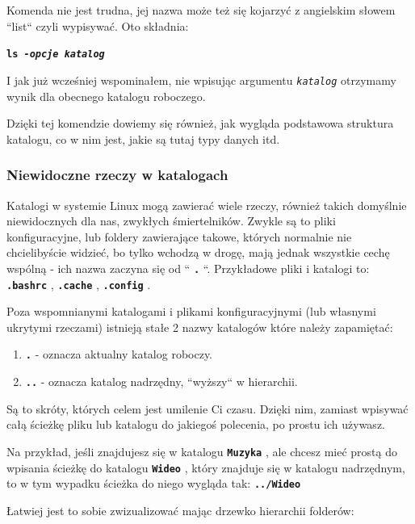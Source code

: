 \documentclass[12pt]{article}
\newcommand{\ttbf}[1]{
    \texttt{\textbf{#1}}
}
\begin{document}
Komenda nie jest trudna, jej nazwa może też się kojarzyć z angielskim słowem ``list`` czyli wypisywać. Oto składnia:

\ttbf{ls \emph{-opcje} \emph{katalog}}

I jak już wcześniej wspominałem, nie wpisując argumentu \texttt{\emph{katalog}} otrzymamy wynik dla obecnego katalogu roboczego.

Dzięki tej komendzie dowiemy się również, jak wygląda podstawowa struktura katalogu, co w nim jest, jakie są tutaj typy danych itd.

\subsubsection{Niewidoczne rzeczy w katalogach}

Katalogi w systemie Linux mogą zawierać wiele rzeczy, również takich domyślnie niewidocznych dla nas, zwykłych śmiertelników. Zwykle są to pliki konfiguracyjne, lub foldery zawierające takowe, których normalnie nie chcielibyście widzieć, bo tylko wchodzą w drogę, mają jednak wszystkie cechę wspólną - ich nazwa zaczyna się od ``\ttbf{.}``. Przykładowe pliki i katalogi to: \ttbf{.bashrc}, \ttbf{.cache}, \ttbf{.config}.

Poza wspomnianymi katalogami i plikami konfiguracyjnymi (lub własnymi ukrytymi rzeczami) istnieją stałe 2 nazwy katalogów które należy zapamiętać:
\begin{enumerate}
    \item \ttbf{.} - oznacza aktualny katalog roboczy.
    \item \ttbf{..} - oznacza katalog nadrzędny, ``wyższy`` w hierarchii.
\end{enumerate}

Są to skróty, których celem jest umilenie Ci czasu. Dzięki nim, zamiast wpisywać całą ścieżkę pliku lub katalogu do jakiegoś polecenia, po prostu ich używasz.

Na przykład, jeśli znajdujesz się w katalogu \ttbf{Muzyka}, ale chcesz mieć prostą do wpisania ścieżkę do katalogu \ttbf{Wideo}, który znajduje się w katalogu nadrzędnym, to w tym wypadku ścieżka do niego wygląda tak: \ttbf{../Wideo}

Łatwiej jest to sobie zwizualizować mając drzewko hierarchii folderów:

\hfill
\end{document}
